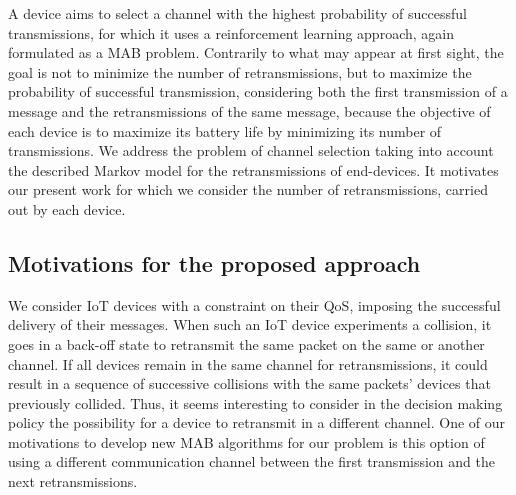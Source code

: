 A device aims to select a channel with the highest probability of successful transmissions, for which it uses a reinforcement learning approach, again formulated as a MAB problem.
Contrarily to what may appear at first sight,
the goal is not to minimize the number of retransmissions, but to maximize the probability of successful transmission, considering both the first transmission of a message and the retransmissions of the same message, because the objective of each device is to maximize its battery life by minimizing its number of transmissions.
%
We address the problem of channel selection taking into account the described Markov model for the retransmissions of end-devices.
It motivates our present work for which we consider the number of retransmissions, carried out by each device.
%

\subsection{Motivations for the proposed approach}
\label{sub:43:motivations}

We consider IoT devices with a constraint on their QoS, imposing the successful delivery of their messages.
When such an IoT device experiments a collision, it goes in a back-off state to retransmit the same packet on the same or another channel.
If all devices remain in the same channel for retransmissions, it could result in a sequence of successive collisions with the same packets' devices that previously collided.
%
Thus, it seems interesting to consider in the decision making policy the possibility for a device to retransmit in a different channel.
One of our motivations to develop new MAB algorithms for our problem is this option of using a different communication channel between the first transmission and the next retransmissions.

